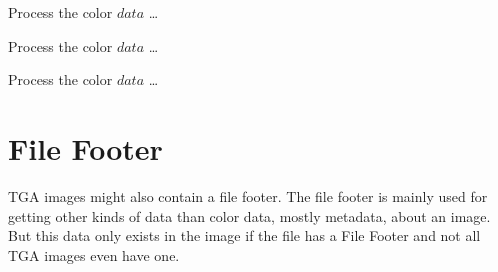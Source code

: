 \begin{algorithm}[H]
  \caption{Reading and decompressing the color data of a TGA file.}
  \label{alg:TGA-read-colordata}
  \newcommand{\process}{\State Process the color $data$ \dots}
  \begin{algorithmic}[1]





        \EndIf

          \process
        \EndRepeatn

    \Else



        \EndIf

        \process


        \EndRepeatn

       \EndIf
    \Else


      \EndIf

      \process


    \EndIf
    \EndWhile
  \end{algorithmic}
\end{algorithm}

\section{File Footer}

TGA images might also contain a file footer. The file footer is mainly
used for getting other kinds of data than color data, mostly metadata,
about an image. But this data only exists in the image if the file has
a File Footer and not all TGA images even have one.

